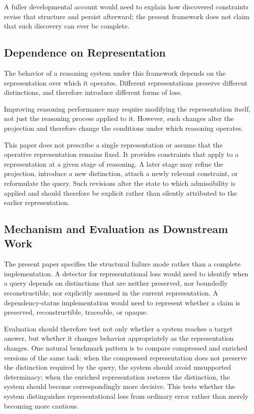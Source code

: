 \documentclass[11pt]{article}
\begin{document}
A fuller developmental account would need to explain how discovered constraints revise that structure and persist afterward; the present framework does not claim that such discovery can ever be complete.

\subsection{Dependence on Representation}

The behavior of a reasoning system under this framework depends on the representation over which it operates. Different representations preserve different distinctions, and therefore introduce different forms of loss.

Improving reasoning performance may require modifying the representation itself, not just the reasoning process applied to it. However, such changes alter the projection and therefore change the conditions under which reasoning operates.

This paper does not prescribe a single representation or assume that the operative representation remains fixed. It provides constraints that apply to a representation at a given stage of reasoning. A later stage may refine the projection, introduce a new distinction, attach a newly relevant constraint, or reformulate the query. Such revisions alter the state to which admissibility is applied and should therefore be explicit rather than silently attributed to the earlier representation.

\subsection{Mechanism and Evaluation as Downstream Work}

The present paper specifies the structural failure mode rather than a complete implementation. A detector for representational loss would need to identify when a query depends on distinctions that are neither preserved, nor boundedly reconstructible, nor explicitly assumed in the current representation. A dependency-status implementation would need to represent whether a claim is preserved, reconstructible, traceable, or opaque.

Evaluation should therefore test not only whether a system reaches a target answer, but whether it changes behavior appropriately as the representation changes. One natural benchmark pattern is to compare compressed and enriched versions of the same task: when the compressed representation does not preserve the distinction required by the query, the system should avoid unsupported determinacy; when the enriched representation restores the distinction, the system should become correspondingly more decisive. This tests whether the system distinguishes representational loss from ordinary error rather than merely becoming more cautious.
\end{document}

